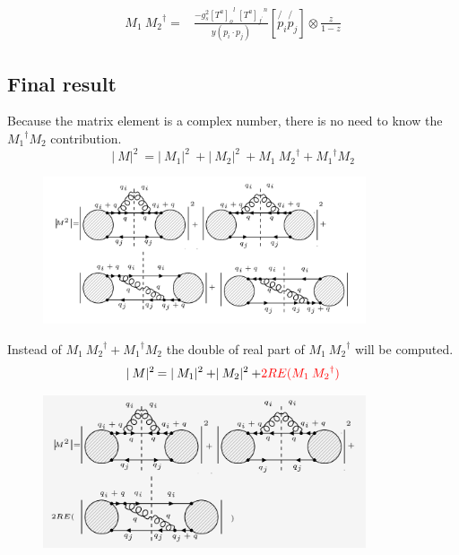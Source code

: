 \begin{equation}
\begin{split}
M_1\: {M_2}^{\dagger} =& \frac{-g_s^2 {[T^a]_o}^l \:{[T^a]_{f^{\prime}}}^n }{y(p_i \cdot p_j)} [\not{p_i}\not{p_j}]\otimes\frac{z}{1-z}
\end{split}
\end{equation}









\pagebreak

\subsection{Final result}
Because the matrix element is a complex number, there is no need to know the $ {M_1}^{\dagger} M_2 $ contribution.
\begin{equation}
\lvert\:M\lvert^2\: = \lvert\:M_1\lvert^2\:+\lvert\:M_2\lvert^2\:+ M_1\: {M_2}^{\dagger} +{M_1}^{\dagger} M_2
\end{equation}
\begin{figure}[h!]
\centering
\includegraphics[width=0.85\textwidth]{images/QQ/qqgMSquer.png}
\end{figure}
Instead of $ M_1\: {M_2}^{\dagger} +{M_1}^{\dagger} M_2 $ the double of real part of $M_1\: {M_2}^{\dagger}$ will be computed.
\begin{equation}
\lvert\:M\lvert^2\: = \lvert\:M_1\lvert^2\:+\lvert\:M_2\lvert^2\:+ {\color[RGB]{255,0,0} 2RE(M_1\: {M_2}^{\dagger})}
\end{equation}
\begin{figure}[h!]
\centering
\includegraphics[width=0.85\textwidth]{images/QQ/REqqgMSquer.png}
\end{figure}
